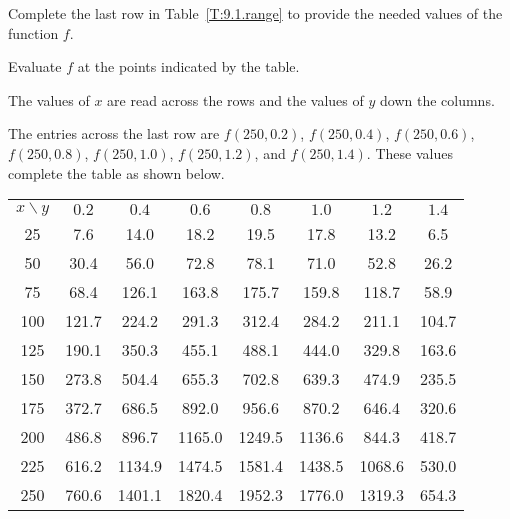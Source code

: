 \begin{activity} \label{A:9.1.2} Complete the last row in
  Table~\ref{T:9.1.range} to provide the needed values of the function
  $f$. 

\end{activity}
\begin{smallhint}
Evaluate $f$ at the points indicated by the table.
\end{smallhint}
\begin{bighint}
  The values of $x$ are read across the rows and the values of $y$
  down the columns.
\end{bighint}
\begin{activitySolution}

The entries across the last row are $f\left(250,0.2\right)$, $f\left(250,0.4\right)$, $f\left(250,0.6\right)$, $f\left(250,0.8\right)$, $f\left(250,1.0\right)$, $f\left(250,1.2\right)$, and $f\left(250,1.4\right)$. These values complete the table as shown below. 
\begin{center}
\begin{tabular}{|c|c|c|c|c|c|c|c|} \hline
$x\backslash y$   &$0.2$ 	&$0.4$ 	&$0.6$ 	&$0.8$ 	&$1.0$ 	&$1.2$ &$1.4$      \\ \hhline{|=|=|=|=|=|=|=|=|}
25       &7.6		&14.0	&18.2	&19.5	&17.8	&13.2	&6.5      \\ \hline
50       &30.4		&56.0	&72.8	&78.1	&71.0	&52.8	&26.2     \\ \hline
75       &68.4		&126.1	&163.8	&175.7	&159.8	&118.7	&58.9   \\ \hline
100      &121.7	&224.2	&291.3	&312.4	&284.2	&211.1	&104.7    \\ \hline
125      &190.1	&350.3	&455.1	&488.1	&444.0	&329.8	&163.6    \\ \hline
150      &273.8	&504.4	&655.3	&702.8	&639.3	&474.9	&235.5    \\ \hline
175      &372.7	&686.5	&892.0	&956.6	&870.2	&646.4	&320.6    \\ \hline
200      &486.8	&896.7	&1165.0	&1249.5	&1136.6	&844.3	&418.7    \\ \hline
225      &616.2	&1134.9	&1474.5	&1581.4	&1438.5	&1068.6	&530.0   \\ \hline
250     &760.6		&1401.1	&1820.4	&1952.3	&1776.0	&1319.3	&654.3  \\ \hline
\end{tabular}
\end{center}


\end{activitySolution}
